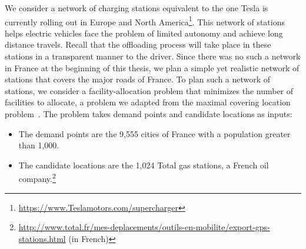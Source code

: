 We consider a network of charging stations equivalent to the one Tesla is currently rolling out in Europe and North America\footnote{\url{https://www.Teslamotors.com/supercharger}}. This network of stations helps electric vehicles face the problem of limited autonomy and achieve long distance travels. Recall that the offloading process will take place in these stations in a transparent manner to the driver. Since there was no such a network in France at the beginning of this thesis, we plan a simple yet realistic network of stations that covers the major roads of France. To plan such a network of stations, we consider a facility-allocation problem that minimizes the number of facilities to allocate, a problem we adapted from the maximal covering location problem~\cite{church1974maximal}. The problem takes demand points and candidate locations as inputs:
\begin{itemize}

	\item The demand points are the 9,555 cities of France with a population greater than 1,000.
   
	\item The candidate locations are the 1,024 Total gas stations, a French oil company.\footnote{\url{http://www.total.fr/mes-deplacements/outils-en-mobilite/export-gps-stations.html} (in French)}

\end{itemize}

